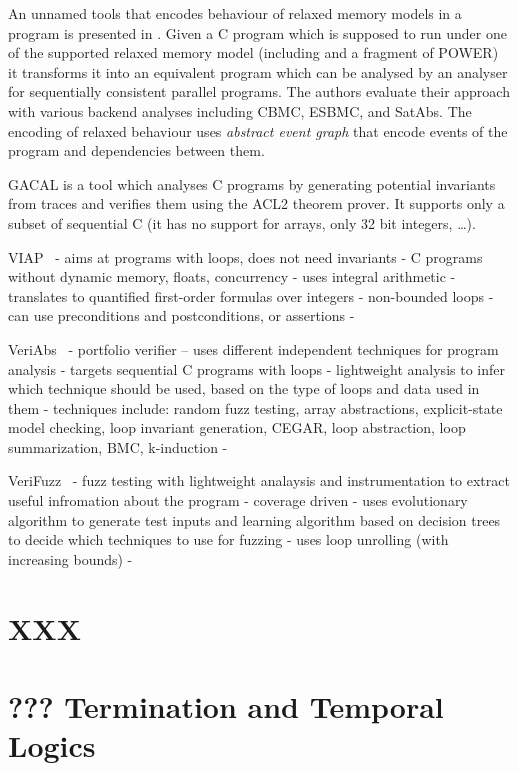 An unnamed tools that encodes behaviour of relaxed memory models in a program is presented in .
Given a C program which is supposed to run under one of the supported relaxed memory model (including \xtso and a fragment of POWER) it transforms it into an equivalent program which can be analysed by an analyser for sequentially consistent parallel programs.
The authors evaluate their approach with various backend analyses including CBMC, ESBMC, and SatAbs.
The encoding of relaxed behaviour uses \emph{abstract event graph} that encode events of the program and dependencies between them.

GACAL  is a tool which analyses C programs by generating potential invariants from traces and verifies them using the ACL2 theorem prover.
It supports only a subset of sequential C (it has no support for arrays, only 32 bit integers, …). 

VIAP~
- aims at programs with loops, does not need invariants
- C programs without dynamic memory, floats, concurrency
- uses integral arithmetic
- translates to quantified first-order formulas over integers
- non-bounded loops
- can use preconditions and postconditions, or assertions
- 

VeriAbs~
- portfolio verifier -- uses different independent techniques for program analysis
- targets sequential C programs with loops
- lightweight analysis to infer which technique should be used, based on the type of loops and data used in them
- techniques include: random fuzz testing, array abstractions, explicit-state model checking, loop invariant generation, CEGAR, loop abstraction, loop summarization, BMC, k-induction
- 

VeriFuzz~
- fuzz testing with lightweight analaysis and instrumentation to extract useful infromation about the program
- coverage driven
- uses evolutionary algorithm to generate test inputs and learning algorithm based on decision trees to decide which techniques to use for fuzzing
- uses loop unrolling (with increasing bounds)
- 

\iffalse
\section{XXX}

\section{??? Termination and Temporal Logics}

